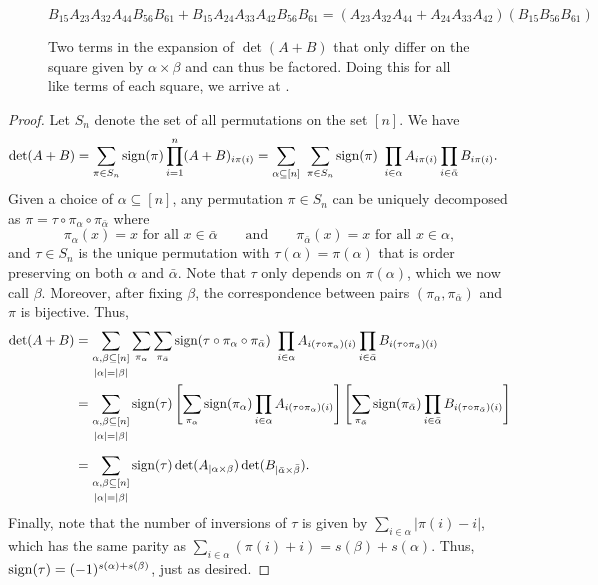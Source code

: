 \documentclass{article}
\begin{document}
\begin{figure}[t]
	\begin{center}
		
	\end{center}
	\vspace{-2mm}
	{\color{captioncolor}
		\[
		B_{15}A_{23}A_{32}A_{44}B_{56}B_{61} + B_{15}A_{24}A_{33}A_{42}B_{56}B_{61} = (A_{23}A_{32}A_{44}+A_{24}A_{33}A_{42})(B_{15}B_{56}B_{61})
		\]}
	\vspace{-5mm}
	\caption{Two terms in the expansion of $\det(A+B)$ that only differ on the square given by $\alpha\times\beta$ and can thus be factored. Doing this for all like terms of each square, we arrive at .}
	\label{fig:det-sum}
\end{figure}

\begin{proof}
Let $S_n$ denote the set of all permutations on the set $[n]$. We have
	\begin{align*}
		\det(A+B) &= \sum_{\pi\in S_n}\sign(\pi)\prod_{i = 1}^n(A+B)_{i\pi(i)}
		= \sum_{\alpha\subseteq [n]}\ \sum_{\pi\in S_n}\sign(\pi)\ \prod_{i \in \alpha} A_{i\pi(i)}\prod_{i \in \bar\alpha} B_{i\pi(i)}.
	\end{align*}
	Given a choice of $\alpha \subseteq [n]$, any permutation $\pi\in S_n$ can be uniquely decomposed as $\pi = \tau\circ\pi_{\alpha}\circ \pi_{\bar\alpha}$ where
	\[
	\pi_{\alpha}(x) = x \text{ for all } x\in\bar\alpha\qquad\text{and}\qquad \pi_{\bar\alpha}(x) = x \text{ for all } x\in\alpha,
	\]
	and $\tau\in S_n$ is the unique permutation with $\tau(\alpha) = \pi(\alpha)$ that is order preserving on both $\alpha$ and $\bar\alpha$. Note that $\tau$ only depends on $\pi(\alpha)$, which we now call $\beta$. Moreover, after fixing $\beta$, the correspondence between pairs $(\pi_\alpha,\pi_{\bar\alpha})$ and $\pi$ is bijective. Thus,
\allowdisplaybreaks
\begin{align*}
		\det(A+B) &= \sum_{\substack{\alpha,\beta\subseteq [n]\\[1mm]|\alpha|=|\beta|}}\sum_{\pi_\alpha}\sum_{\pi_{\bar\alpha}}\operatorname{sign}(\tau\circ \pi_{\alpha}\circ \pi_{\bar\alpha})\ \prod_{i \in \alpha} A_{i(\tau\circ \pi_\alpha)(i)}\prod_{i \in \bar\alpha} B_{i(\tau\circ \pi_{\bar\alpha})(i)}\\
		&= \sum_{\substack{\alpha,\beta\subseteq [n]\\[1mm]|\alpha|=|\beta|}}\operatorname{sign}(\tau)\left[\sum_{\pi_\alpha}\operatorname{sign}(\pi_{\alpha})\prod_{i \in \alpha} A_{i(\tau\circ \pi_\alpha)(i)}\right]\left[\sum_{\pi_{\bar\alpha}} \operatorname{sign}(\pi_{\bar\alpha})\prod_{i \in \bar\alpha}B_{i(\tau\circ \pi_{\bar\alpha})(i)}\right]\\[2mm]
		&= \sum_{\substack{\alpha,\beta\subseteq [n]\\[1mm]|\alpha|=|\beta|}}\operatorname{sign}(\tau)\det(A_{|\alpha\times \beta})\det(B_{|\bar\alpha\times \bar\beta}).
	\end{align*}
	Finally, note that the number of inversions of $\tau$ is given by
	$\sum_{i\in\alpha}|\pi(i)-i|$, which has the same parity as $\sum_{i\in\alpha}(\pi(i)+i) = s(\beta) + s(\alpha)$.
	Thus, $\operatorname{sign}(\tau) = (-1)^{s(\alpha)+s(\beta)}$, just as desired.
\end{proof}
\end{document}
